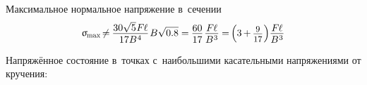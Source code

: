 \documentclass[14pt]{extarticle}
\begin{document}
Максимальное нормальное напряжение в~сечении
\[
\upsigma_{\hspace{-0.2ex}\scalebox{.75}{max}} \hspace{-.33ex}
\neq \hspace{-.15ex} \displaystyle\frac{\raisebox{-0.18em}{$30 \sqrt{5} \hspace{.1ex} F \hspace{-0.1ex} \ell$}}{17 B^{\hspace{.1ex}4}} \hspace{.2ex} B \sqrt{0.8}
= \hspace{-.1ex} \displaystyle\frac{\raisebox{-0.18em}{$60$}}{17} \hspace{.2ex} \displaystyle\frac{\raisebox{-0.18em}{$F \hspace{-0.1ex} \ell$}}{B^{\hspace{.1ex}3}} \hspace{-.1ex}
= \hspace{-.25ex} \left( 3 \hspace{-.15ex}+\hspace{-.15ex} \scalebox{.88}{$ \displaystyle\frac{\raisebox{-0.18em}{$9$}}{17} $} \hspace{.1ex} \right) \hspace{-.4ex} \displaystyle\frac{\raisebox{-0.18em}{$F \hspace{-0.1ex} \ell$}}{B^{\hspace{.1ex}3}}
\]

\vspace{.2cm}

Напряжённое состояние в~точках с~наибольшими касательными напряжениями от кручения:
\end{document}
